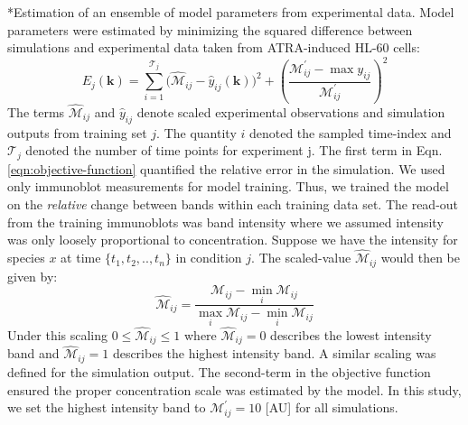 \documentclass[12pt]{article}
\makeatletter
\renewcommand\subsection{\@startsection
	{subsection}{2}{0mm}
	{-0.05in}
	{-0.5\baselineskip}
	{\normalfont\normalsize\bfseries}}
\makeatother
\begin{document}
\subsection*{Estimation of an ensemble of model parameters from experimental data.}
Model parameters were estimated by minimizing the squared difference between simulations and experimental data taken from ATRA-induced HL-60 cells:
\begin{equation}\label{eqn:objective-function}
	E_{j}(\mathbf{k}) = \sum_{i=1}^{\mathcal{T}_{j}}\biggl(\hat{\mathcal{M}}_{ij}-\hat{y}_{ij}(\mathbf{k})\biggr)^2 + \left(\frac{{\mathcal{M}^{\prime}_{ij}}-\max{y_{ij}}}{{\mathcal{M}^{\prime}_{ij}}}\right)^{2}
\end{equation}
The terms $\hat{\mathcal{M}}_{ij}$ and $\hat{y}_{ij}$ denote scaled experimental observations and simulation outputs from training set $j$. 
The quantity $i$ denoted the sampled time-index and $\mathcal{T}_{j}$ denoted the number of time points for experiment j. 
The first term in Eqn. \eqref{eqn:objective-function} quantified the relative error in the simulation. 
We used only immunoblot measurements for model training. 
Thus, we trained the model on the \emph{relative} change between bands within each training data set.
The read-out from the training immunoblots was band intensity where we assumed intensity was only loosely proportional to concentration.
Suppose we have the intensity for species $x$ at time $\{t_{1},t_{2},..,t_{n}\}$ in condition $j$. The scaled-value $\hat{\mathcal{M}}_{ij}$ would then be given by:
\begin{equation}\label{norm_exp_data}
\hat{\mathcal{M}}_{ij} = \frac{\mathcal{M}_{ij} - \min_{i}\mathcal{M}_{ij}}{\max_{i}{\mathcal{M}_{ij}}-\min_{i}{\mathcal{M}_{ij}}}
\end{equation}
Under this scaling $0\leq\hat{\mathcal{M}}_{ij}\leq{1}$ where $\hat{\mathcal{M}}_{ij}=0$ describes the lowest intensity band and $\hat{\mathcal{M}}_{ij}=1$ describes the highest intensity band. 
A similar scaling was defined for the simulation output. The second-term in the objective function ensured the proper concentration scale was estimated by the model.
In this study, we set the highest intensity band to $\mathcal{M}^{\prime}_{ij} = 10$ [AU] for all simulations. 
\end{document}
